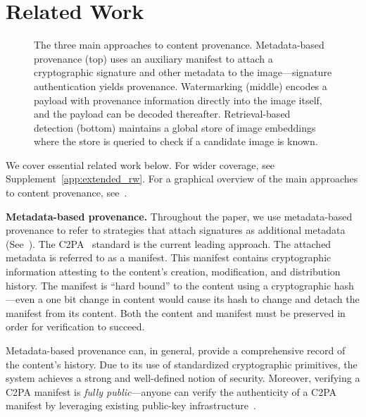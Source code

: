 \section{Related Work}
\begin{figure*}[t]
    \centering
    \caption{The three main approaches to content provenance. 
    Metadata-based provenance (top) uses an auxiliary manifest to attach a cryptographic signature and other metadata to the image---signature authentication yields provenance.
    Watermarking (middle) encodes a payload with provenance information directly into the image itself, and the payload can be decoded thereafter.
    Retrieval-based detection (bottom) maintains a global store of image embeddings where the store is queried to check if a candidate image is known.}
    \label{fig:misinformation_approaches}
\end{figure*}
We cover essential related work below.
For wider coverage, see Supplement~\ref{app:extended_rw}.
For a graphical overview of the main approaches to content provenance, see~.

\textbf{Metadata-based provenance.}
Throughout the paper, we use metadata-based provenance to refer to strategies that attach signatures as additional metadata (See~).
The C2PA~\citep{c2pa2023coalition} standard is the current leading approach.
The attached metadata is referred to as a manifest.
This manifest contains cryptographic information attesting to the content's creation, modification, and distribution history.
The manifest is ``hard bound'' to the content using a cryptographic hash---even a one bit change in content would cause its hash to change and detach the manifest from its content.
Both the content and manifest must be preserved in order for verification to succeed.

Metadata-based provenance can, in general, provide a comprehensive record of the content's history.
Due to its use of standardized cryptographic primitives, the system achieves a strong and well-defined notion of security.
Moreover, verifying a C2PA manifest is \textit{fully public}---anyone can verify the authenticity of a C2PA manifest by leveraging existing public-key infrastructure~\citep{laurie2014certificate}.

